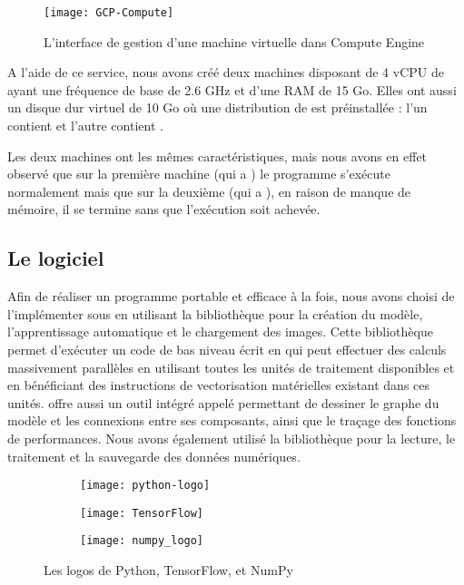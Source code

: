 \begin{figure}[h]
  \centering
  \texttt{[image: GCP-Compute]}
  \caption{L'interface de gestion d'une machine virtuelle dans Compute Engine}
\end{figure}

A l'aide de ce service, nous avons créé deux machines disposant de 4 vCPU
de  ayant une fréquence de base de 2.6 GHz et d'une
RAM de 15 Go. Elles ont aussi un disque dur virtuel de 10 Go où une distribution
de  est préinstallée : l'un contient  et l'autre
contient .

Les deux machines ont les mêmes caractéristiques, mais nous avons en effet
observé que sur la première machine (qui a ) le programme s'exécute
normalement mais que sur la deuxième (qui a ), en raison de manque
de mémoire, il se termine sans que l'exécution soit achevée.

\subsection{Le logiciel}

Afin de réaliser un programme portable et efficace à la fois, nous avons choisi
de l'implémenter sous  \cite{python3} en utilisant la bibliothèque  \cite{DBLP:journals/corr/AbadiABBCCCDDDG16}
pour la création du modèle, l'apprentissage automatique et le chargement des images.
Cette bibliothèque permet d'exécuter un code de bas niveau écrit en  \cite{stroustrup1995c++}
qui peut effectuer des calculs massivement parallèles en utilisant toutes les unités
de traitement disponibles et en bénéficiant des instructions de vectorisation matérielles
existant dans ces unités.  offre aussi un outil intégré
appelé  permettant de dessiner le graphe du modèle et les
connexions entre ses composants, ainsi que le traçage des fonctions de performances.
Nous avons également utilisé la bibliothèque  \cite{walt2011numpy} pour la lecture,
le traitement et la sauvegarde des données numériques.

\begin{figure}[h]
\centering
\begin{subfigure}{0.3\textwidth}\texttt{[image: python-logo]}\end{subfigure}
\begin{subfigure}{0.3\textwidth}\texttt{[image: TensorFlow]}\end{subfigure}
\begin{subfigure}{0.3\textwidth}\texttt{[image: numpy\_logo]}\end{subfigure}
\caption{Les logos de Python, TensorFlow, et NumPy}
\end{figure}


